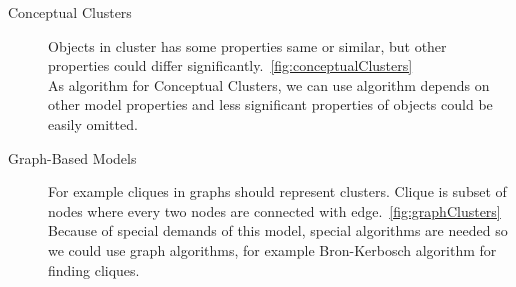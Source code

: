 \begin{description}
\item[Conceptual Clusters] Objects in cluster has some properties same or similar, but other properties could differ significantly.~\autoref{fig:conceptualClusters}\\
As algorithm for Conceptual Clusters, we can use algorithm depends on other model properties and less significant properties of objects could be easily omitted.

\item[Graph-Based Models] For example cliques in graphs should represent clusters. Clique is subset of nodes where every two nodes are connected with edge.~\autoref{fig:graphClusters}\\
Because of special demands of this model, special algorithms are needed so we could use graph algorithms, for example Bron-Kerbosch algorithm for finding cliques. %
\end{description}


